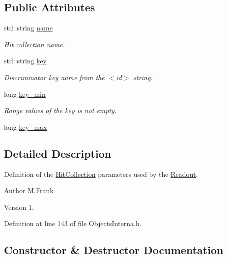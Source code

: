 \subsection*{Public Attributes}
\begin{DoxyCompactItemize}
\item 
std\+::string \hyperlink{class_d_d4hep_1_1_geometry_1_1_hit_collection_a9c9a772a612f38f6104fd976f8b20ba0}{name}
\begin{DoxyCompactList}\small\item\em Hit collection name. \end{DoxyCompactList}\item 
std\+::string \hyperlink{class_d_d4hep_1_1_geometry_1_1_hit_collection_a4948f37ecd677f966101a2d662412790}{key}
\begin{DoxyCompactList}\small\item\em Discriminator key name from the $<$id$>$ string. \end{DoxyCompactList}\item 
long \hyperlink{class_d_d4hep_1_1_geometry_1_1_hit_collection_a34a3fcd70ef34e2b1ecb877805a0f682}{key\+\_\+min}
\begin{DoxyCompactList}\small\item\em Range values of the key is not empty. \end{DoxyCompactList}\item 
long \hyperlink{class_d_d4hep_1_1_geometry_1_1_hit_collection_af307fe48c5092b585933c02e837f177d}{key\+\_\+max}
\end{DoxyCompactItemize}


\subsection{Detailed Description}
Definition of the \hyperlink{class_d_d4hep_1_1_geometry_1_1_hit_collection}{Hit\+Collection} parameters used by the \hyperlink{class_d_d4hep_1_1_geometry_1_1_readout}{Readout}. 

\begin{DoxyAuthor}{Author}
M.\+Frank 
\end{DoxyAuthor}
\begin{DoxyVersion}{Version}
1. 
\end{DoxyVersion}


Definition at line 143 of file Objects\+Interna.\+h.



\subsection{Constructor \& Destructor Documentation}
\hypertarget{class_d_d4hep_1_1_geometry_1_1_hit_collection_aede87fea1d9371d8d8459645dea6a663}{}\label{class_d_d4hep_1_1_geometry_1_1_hit_collection_aede87fea1d9371d8d8459645dea6a663} 
